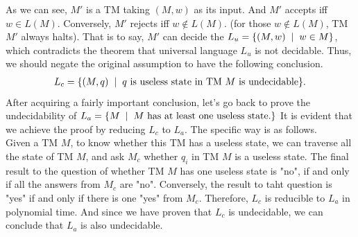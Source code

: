\documentclass[11pt,a4paper]{article}
\newcommand{\htab}{\hspace*{0.63cm}}
\newcommand{\ba}{\hspace*{0.2cm} | \hspace*{0.2cm}}
\newcommand{\lu}{L_{u}}
\begin{document}
 \htab As we can see, $M'$ is a TM taking $(M,w)$ as its input. And $M'$ accepts iff $w \in L(M)$. 
 Conversely, $M'$ rejects iff $w \notin L(M)$. (for those $w \notin L(M)$, TM $M'$ always halts).
 That is to say, $M'$ can decide the $\lu= \{(M,w)\ba w\in M \}$, which contradicts the theorem 
 that universal language $\lu$ is not decidable. Thus, we should negate the original assumption 
 to have the following conclusion. 
 \begin{align}
     L_{c}=\{(M,q)\ba \text{$q$ is useless state in TM $M$ is undecidable} \}. 
 \end{align}
 \htab After acquiring a fairly important conclusion, let's go back to prove the undecidability of 
 $L_{a} = \{ M \ba M \text{ has at least one useless state.}\}$ It is evident that we achieve the
 proof by reducing $L_{c}$ to $L_{a}$. The specific way is as follows. \\
 \htab Given a TM $M$, to know whether this TM has a useless state, we can traverse all the state 
 of TM $M$, and ask $M_{c}$ whether $q_{i}$ in TM $M$ is a useless state. The final result to the 
 question of whether TM $M$ has one useless state is "no", if and only if all the answers from
 $M_{c}$ are "no". Conversely, the result to taht question is "yes" if and only if 
 there is one "yes" from $M_{c}$. Therefore, $L_{c}$ is reducible to $L_{a}$ in polynomial time.
 And since we have proven that $L_{c}$ is undecidable, we can conclude that $L_{a}$ is also undecidable.
\newpage
\newcommand{\lie}{L_{ie}}
\newcommand{\lnw}{L\big(N(w)\big)}
\end{document}
